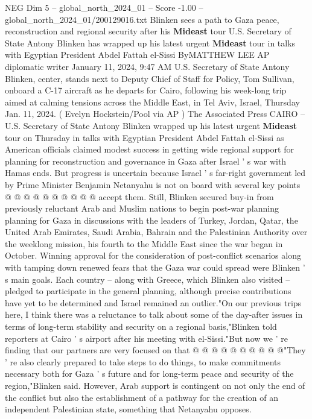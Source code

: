 \begin{textsample}{NEG Dim 5 – global\_north\_2024\_01 – Score -1.00 – global\_north\_2024\_01/200129016.txt}  \label{ex:f5_neg_340}
Blinken sees a path to Gaza peace, reconstruction and regional security after his \textbf{Mideast} tour U.S.
Secretary of State Antony Blinken has wrapped up his latest urgent \textbf{Mideast} tour in talks with Egyptian President Abdel Fattah el-Sissi ByMATTHEW LEE AP diplomatic writer January 11, 2024, 9:47 AM U.S.
Secretary of State Antony Blinken, center, stands next to Deputy Chief of Staff for Policy, Tom Sullivan, onboard a C-17 aircraft as he departs for Cairo, following his week-long trip aimed at calming tensions across the Middle East, in Tel Aviv, Israel, Thursday Jan. 11, 2024. ( Evelyn Hockstein/Pool via AP ) The Associated Press CAIRO -- U.S.
Secretary of State Antony Blinken wrapped up his latest urgent \textbf{Mideast} tour on Thursday in talks with Egyptian President Abdel Fattah el-Sissi as American officials claimed modest success in getting wide regional support for planning for reconstruction and governance in Gaza after Israel ' s war with Hamas ends.
But progress is uncertain because Israel ' s far-right government led by Prime Minister Benjamin Netanyahu is not on board with several key points @ @ @ @ @ @ @ @ @ @ accept them.
Still, Blinken secured buy-in from previously reluctant Arab and Muslim nations to begin post-war planning planning for Gaza in discussions with the leaders of Turkey, Jordan, Qatar, the United Arab Emirates, Saudi Arabia, Bahrain and the Palestinian Authority over the weeklong mission, his fourth to the Middle East since the war began in October.
Winning approval for the consideration of post-conflict scenarios along with tamping down renewed fears that the Gaza war could spread were Blinken ' s main goals.
Each country -- along with Greece, which Blinken also visited -- pledged to participate in the general planning, although precise contributions have yet to be determined and Israel remained an outlier."On our previous trips here, I think there was a reluctance to talk about some of the day-after issues in terms of long-term stability and security on a regional basis,"Blinken told reporters at Cairo ' s airport after his meeting with el-Sissi."But now we ' re finding that our partners are very focused on that @ @ @ @ @ @ @ @ @ @"They ' re also clearly prepared to take steps to do things, to make commitments necessary both for Gaza ' s future and for long-term peace and security of the region,"Blinken said.
However, Arab support is contingent on not only the end of the conflict but also the establishment of a pathway for the creation of an independent Palestinian state, something that Netanyahu opposes.

\end{textsample}
